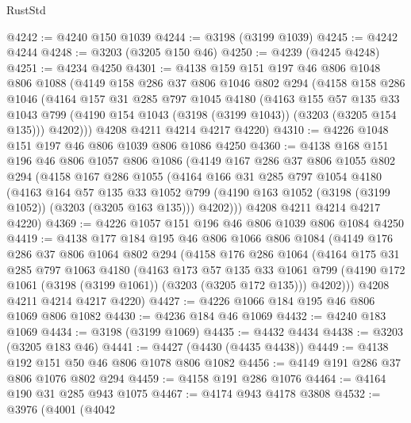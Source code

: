 \begin{lexlean}{RustStd}
\begin{coremodule}
{\begin{coremodule}
{{{{{{{{{{{{{{{@4242 := @4240 @150 @1039
@4244 := @3198 (@3199 @1039)
@4245 := @4242 @4244
@4248 := @3203 (@3205 @150 @46)
@4250 := @4239 (@4245 @4248)
@4251 := @4234 @4250
@4301 := @4138
    @159
    @151
    @197
    @46
    @806
    @1048
    @806
    @1088
    (@4149
      @158
      @286
      @37
      @806
      @1046
      @802
      @294
      (@4158
        @158
        @286
        @1046
        (@4164
          @157
          @31
          @285
          @797
          @1045
          @4180
          (@4163
            @155
            @57
            @135
            @33
            @1043
            @799
            (@4190 @154 @1043 (@3198 (@3199 @1043)) (@3203 (@3205 @154 @135)))
            @4202)))
      @4208
      @4211
      @4214
      @4217
      @4220)
@4310 := @4226 @1048 @151 @197 @46 @806 @1039 @806 @1086 @4250
@4360 := @4138
    @168
    @151
    @196
    @46
    @806
    @1057
    @806
    @1086
    (@4149
      @167
      @286
      @37
      @806
      @1055
      @802
      @294
      (@4158
        @167
        @286
        @1055
        (@4164
          @166
          @31
          @285
          @797
          @1054
          @4180
          (@4163
            @164
            @57
            @135
            @33
            @1052
            @799
            (@4190 @163 @1052 (@3198 (@3199 @1052)) (@3203 (@3205 @163 @135)))
            @4202)))
      @4208
      @4211
      @4214
      @4217
      @4220)
@4369 := @4226 @1057 @151 @196 @46 @806 @1039 @806 @1084 @4250
@4419 := @4138
    @177
    @184
    @195
    @46
    @806
    @1066
    @806
    @1084
    (@4149
      @176
      @286
      @37
      @806
      @1064
      @802
      @294
      (@4158
        @176
        @286
        @1064
        (@4164
          @175
          @31
          @285
          @797
          @1063
          @4180
          (@4163
            @173
            @57
            @135
            @33
            @1061
            @799
            (@4190 @172 @1061 (@3198 (@3199 @1061)) (@3203 (@3205 @172 @135)))
            @4202)))
      @4208
      @4211
      @4214
      @4217
      @4220)
@4427 := @4226 @1066 @184 @195 @46 @806 @1069 @806 @1082
@4430 := @4236 @184 @46 @1069
@4432 := @4240 @183 @1069
@4434 := @3198 (@3199 @1069)
@4435 := @4432 @4434
@4438 := @3203 (@3205 @183 @46)
@4441 := @4427 (@4430 (@4435 @4438))
@4449 := @4138 @192 @151 @50 @46 @806 @1078 @806 @1082
@4456 := @4149 @191 @286 @37 @806 @1076 @802 @294
@4459 := @4158 @191 @286 @1076
@4464 := @4164 @190 @31 @285 @943 @1075
@4467 := @4174 @943 @4178 @3808
@4532 := @3976
    (@4001
      (@4042
}}}}}}}}}}}}}}}
\end{coremodule}}
\end{coremodule}
\end{lexlean}
